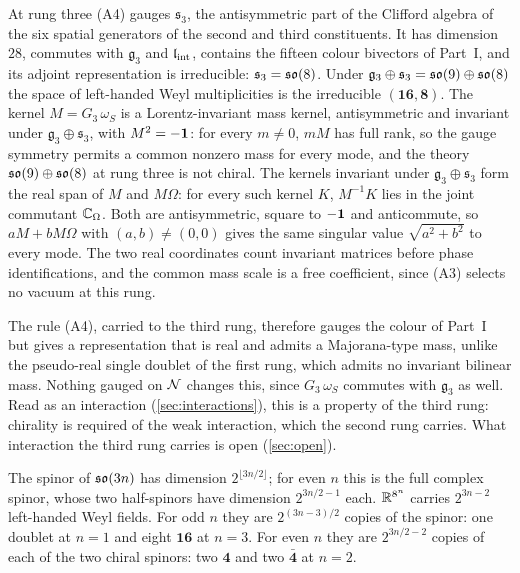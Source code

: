 \begin{proposition}
\label{prop:rung3s}
At rung three (A4) gauges $\mathfrak s_3$, the antisymmetric part of the Clifford algebra of the six spatial generators of the second and
third constituents. It has dimension $28$, commutes with $\mathfrak g_3$ and $\mathfrak l_{\rm int}$, contains the fifteen colour bivectors of Part~I, and its
adjoint representation is irreducible: $\mathfrak s_3=\mathfrak{so}(8)$. Under $\mathfrak g_3\oplus\mathfrak s_3=\mathfrak{so}(9)\oplus\mathfrak{so}(8)$ the space of left-handed
Weyl multiplicities is the irreducible $(\mathbf{16},\mathbf8)$. The kernel $M=G_3\,\omega_S$ is a Lorentz-invariant mass kernel, antisymmetric
and invariant under $\mathfrak g_3\oplus\mathfrak s_3$, with $M^2=-\mathbf 1$: for every $m\ne0$, $mM$ has full rank, so the gauge symmetry permits
a common nonzero mass for every mode, and the theory $\mathfrak{so}(9)\oplus\mathfrak{so}(8)$ at rung three is not chiral. The kernels invariant under $\mathfrak g_3\oplus\mathfrak s_3$
form the real span of $M$ and $M\Omega$: for every such kernel $K$, $M^{-1}K$ lies in the joint commutant $\mathbb{C}_\Omega$. Both are
antisymmetric, square to $-\mathbf 1$ and anticommute, so $aM+bM\Omega$ with $(a,b)\ne(0,0)$ gives the same singular value $\sqrt{a^2+b^2}$ to
every mode. The two real coordinates count invariant matrices before phase identifications, and the common mass scale is a free
coefficient, since (A3) selects no vacuum at this rung.
\end{proposition}

The rule (A4), carried to the third rung, therefore gauges the colour of Part~I but gives a representation that is real and admits a
Majorana-type mass, unlike the pseudo-real single doublet of the first rung, which admits no invariant bilinear mass. Nothing gauged on
$\mathcal N$ changes this, since $G_3\,\omega_S$ commutes with $\mathfrak g_3$ as well. Read as an interaction (\cref{sec:interactions}), this is a
property of the third rung: chirality is required of the weak interaction, which the second rung carries. What interaction the third rung
carries is open (\cref{sec:open}).

\begin{remark}[Counts]
The spinor of $\mathfrak{so}(3n)$ has dimension $2^{\lfloor3n/2\rfloor}$; for even $n$ this is the full complex spinor, whose two half-spinors have
dimension $2^{3n/2-1}$ each. $\mathbb{R}^{8^n}$ carries $2^{3n-2}$ left-handed Weyl fields. For odd $n$ they
are $2^{(3n-3)/2}$ copies of the spinor: one doublet at $n=1$ and eight $\mathbf{16}$ at $n=3$. For even $n$ they are $2^{3n/2-2}$ copies of
each of the two chiral spinors: two $\mathbf4$ and two $\bar{\mathbf4}$ at $n=2$.
\end{remark}

